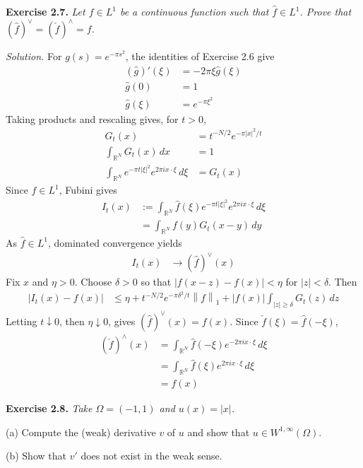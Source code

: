 \documentclass[12pt,letterpaper]{article}
\newcommand{\R}{\mathbb R}
\newcommand{\norm}[1]{\left\lVert #1\right\rVert}
\newcommand{\exercise}[1]{%
  \par\bigskip\noindent\textbf{Exercise #1.}\enspace}
\newenvironment{statement}{\itshape\ignorespaces}{\par}
\newcommand{\solution}{\par\medskip\noindent\textit{Solution.}\enspace}
\begin{document}
\begin{samepage}
\exercise{2.7}
\begin{statement}
Let $f\in L^1$ be a continuous function such that $\widehat f\in L^1$.
Prove that $(\widehat f)^\vee=(\check f)^\wedge=f$.
\end{statement}
\end{samepage}
\solution
For $g(s)=e^{-\pi s^2}$, the identities of Exercise 2.6 give
\begin{align*}
 (\widehat g)'(\xi)&=-2\pi\xi\widehat g(\xi)\\
 \widehat g(0)&=1\\
 \widehat g(\xi)&=e^{-\pi\xi^2}
\end{align*}
Taking products and rescaling gives, for $t>0$,
\begin{align*}
 G_t(x)&=t^{-N/2}e^{-\pi|x|^2/t}\\
 \int_{\R^N}G_t(x)\,dx&=1\\
 \int_{\R^N}e^{-\pi t|\xi|^2}e^{2\pi i x\cdot\xi}\,d\xi&=G_t(x)
\end{align*}
Since $f\in L^1$, Fubini gives
\begin{align*}
 I_t(x)
 &:=\int_{\R^N}\widehat f(\xi)e^{-\pi t|\xi|^2}
                 e^{2\pi i x\cdot\xi}\,d\xi\\
 &=\int_{\R^N}f(y)G_t(x-y)\,dy
\end{align*}
As $\widehat f\in L^1$, dominated convergence yields
\begin{align*}
 I_t(x)&\longrightarrow(\widehat f)^\vee(x)
\end{align*}
Fix $x$ and $\eta>0$. Choose $\delta>0$ so that
$|f(x-z)-f(x)|<\eta$ for $|z|<\delta$. Then
\begin{align*}
 |I_t(x)-f(x)|
 &\leq\eta+t^{-N/2}e^{-\pi\delta^2/t}\norm f_1
       +|f(x)|\int_{|z|\geq\delta}G_t(z)\,dz
\end{align*}
Letting $t\downarrow0$, then $\eta\downarrow0$, gives
$(\widehat f)^\vee(x)=f(x)$. Since $\check f(\xi)=\widehat f(-\xi)$,
\begin{align*}
 (\check f)^\wedge(x)
 &=\int_{\R^N}\widehat f(-\xi)e^{-2\pi i x\cdot\xi}\,d\xi\\
 &=\int_{\R^N}\widehat f(\xi)e^{2\pi i x\cdot\xi}\,d\xi\\
 &=f(x)
 \tag*{$\square$}
\end{align*}


\begin{samepage}
\exercise{2.8}
\begin{statement}
Take $\Omega=(-1,1)$ and $u(x)=|x|$.
\par\smallskip
(a) Compute the (weak) derivative $v$ of $u$ and show that
$u\in W^{1,\infty}(\Omega)$.
\par\smallskip
(b) Show that $v'$ does not exist in the weak sense.
\end{statement}
\end{samepage}
\end{document}
